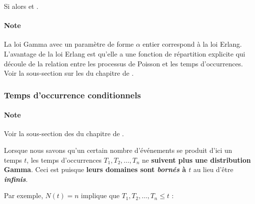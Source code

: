 \documentclass[french]{article}
\begin{document}
\begin{multicols*}{2}
\begin{definitionNOHFILLprop}
Si  alors  et .

\bigskip

\paragraph{Note}	La loi Gamma avec un paramètre de forme $\alpha$ entier correspond à la loi Erlang. L'avantage de la loi Erlang est qu'elle a une fonction de répartition explicite qui découle de la relation entre les processus de Poisson et les temps d'occurrences. Voir la sous-section sur les \textbf{} du chapitre de .
\end{definitionNOHFILLprop}


\subsubsection{Temps d'occurrence conditionnels}\label{subsubsec:ProcPoisTempsOccurCond}
\paragraph{Note}	Voir la sous-section des \textbf{} du chapitre de .

\bigskip

Lorsque nous savons qu'un certain nombre d'événements se produit d'ici un temps $t$, les temps d'occurrences $T_{1}, T_{2}, \dots, T_{n}$ ne \textbf{suivent plus une distribution Gamma}. Ceci est puisque \textbf{leurs domaines sont \textit{bornés} à $t$} au lieu d'être \textit{\textbf{infinis}}.

\bigskip

Par exemple, $N(t) = n$ implique que $T_{1}, T_{2}, \dots, T_{n} \leq t$ :
\begin{center}
\begin{tikzpicture}[x=0.75pt,y=0.75pt,yscale=-1,xscale=1]


\end{tikzpicture}
\end{center}
\end{multicols*}
\end{document}
